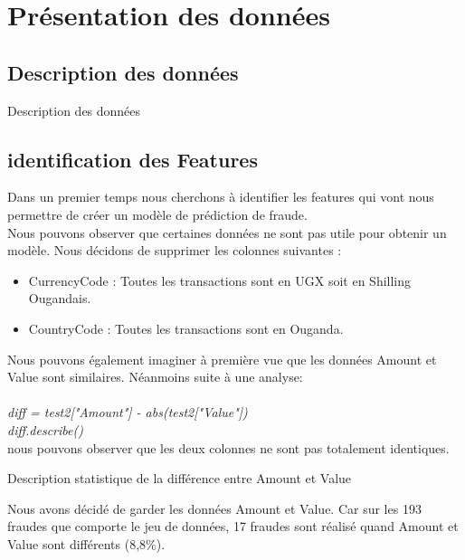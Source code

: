 \documentclass{article}
\begin{document}
\section{Présentation des données}
\subsection{Description des données}

\begin{table}[h]
\centering
{}
\caption{Description des données}
\end{table}

\subsection{identification des Features}
Dans un premier temps nous cherchons à identifier les features qui vont nous permettre de créer un modèle de prédiction de fraude.\\

Nous pouvons observer que certaines données ne sont pas utile pour obtenir un modèle. 
Nous décidons de supprimer les colonnes suivantes :
\begin{itemize}
    \item CurrencyCode : Toutes les transactions sont en UGX soit en Shilling Ougandais.
    \item CountryCode : Toutes les transactions sont en Ouganda.
\end{itemize} 
Nous pouvons également imaginer à première vue que les données Amount et Value sont similaires.
Néanmoins suite à une analyse: \\ \\
\emph{diff = test2["Amount"] - abs(test2["Value"])\\diff.describe()}\\

nous pouvons observer que les deux colonnes ne sont pas totalement identiques.\\
\begin{table}[h]
    \centering
    \caption{Description statistique de la différence entre Amount et Value}
        
 \end{table}

Nous avons décidé de garder les données Amount et Value. Car sur les 193 fraudes que comporte le jeu de données, 
17  fraudes sont réalisé quand Amount et Value sont différents (8,8\%).\\
\end{document}
